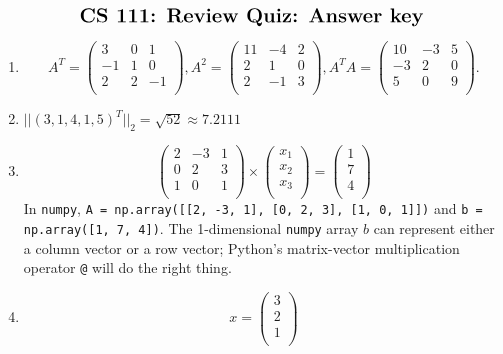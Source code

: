 \documentclass[11pt]{article}
\newcommand{\numpy}{{\tt numpy}}    %
\begin{document}
$$\mbox{\Large \bf CS 111: Review Quiz: Answer key} $$

\medskip


\begin{enumerate}

\item
$$ 
A^T = \left(
\begin{array}{ccc}
3 & 0 & 1 \\ 	
-1 & 1 & 0 \\ 
2 & 2 & -1 \\
\end{array} 
\right),
A^2 = \left(
\begin{array}{ccc}
11 & -4 & 2 \\
2 & 1 & 0 \\ 
2 & -1 & 3 \\
\end{array} 
\right),
A^TA = \left(
\begin{array}{ccc}
10 & -3 & 5 \\
-3 & 2 & 0 \\
5 & 0 & 9 \\
\end{array} 
\right).
$$

\item
$||(3,1,4,1,5)^T||_2 = \sqrt{52} \approx 7.2111$

\item
$$
\left(
\begin{array}{ccc}
2 & -3 & 1 \\
0 & 2 & 3 \\ 
1 & 0 & 1 \\
\end{array} 
\right) 
\times
\left(
\begin{array}{c}
 x_1 \\
 x_2 \\ 
 x_3 \\
\end{array} 
\right) 
=
\left(
\begin{array}{c}
 1 \\
 7 \\ 
 4 \\
\end{array} 
\right) 
$$
In \numpy, {\tt A = np.array([[2, -3, 1], [0, 2, 3], [1, 0, 1]])}
and {\tt b = np.array([1, 7, 4])}.
The 1-dimensional {\tt numpy} array $b$ can represent either a
column vector or a row vector; Python's matrix-vector multiplication
operator {\tt @} will do the right thing.

\item
$$x = 
\left(
\begin{array}{c}
 3 \\
 2 \\ 
 1 \\
\end{array} 
\right) 
$$


\end{enumerate}
\end{document}
